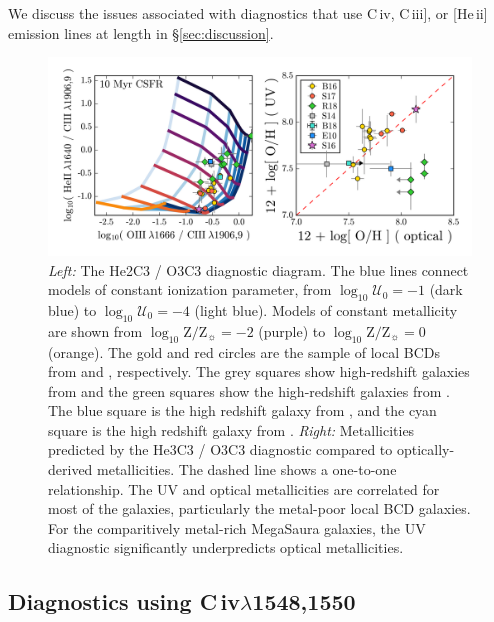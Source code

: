 \documentclass[preprint2]{aastex62}
\newcommand{\heii}{[He\,{\sc ii}]\xspace}
\newcommand{\civ}{C\,{\sc iv}\xspace}
\newcommand{\ciii}{C\,{\sc iii}]\xspace}
\newcommand{\logten}{\ensuremath{\log_{10}}}
\newcommand{\logZeq}[1]{\ensuremath{\logten \mathrm{Z}/\mathrm{Z}_{\sun} = #1}}
\newcommand{\logUeq}[1]{\ensuremath{\logten \mathcal{U}_0 = #1}}
\newcommand{\mage}{{\sc Meg}a{\sc S}a{\sc ura}\xspace}
\begin{document}
We discuss the issues associated with diagnostics that use \civ, \ciii, or \heii emission lines at length in \S\ref{sec:discussion}.

\begin{figure}
  \begin{center}
    \includegraphics[width=\linewidth]{figs/f4.png}
    \caption{\emph{Left:} The He2C3 / O3C3 diagnostic diagram.  The blue lines connect models of constant ionization parameter, from \logUeq{-1} (dark blue) to \logUeq{-4} (light blue). Models of constant metallicity are shown from \logZeq{-2} (purple) to \logZeq{0} (orange). The gold and red circles are the sample of local BCDs from \citet{Berg+2016} and \citet{Senchyna+2017}, respectively. The grey squares show high-redshift galaxies from \citet{Stark+2014} and the green squares show the high-redshift galaxies from \citet{Rigby+2018b}. The blue square is the high redshift galaxy from \citet{Erb+2010}, and the cyan square is the high redshift galaxy from \citet{Berg+2018}. \emph{Right:} Metallicities predicted by the He3C3 / O3C3 diagnostic compared to optically-derived metallicities. The dashed line shows a one-to-one relationship. The UV and optical metallicities are correlated for most of the galaxies, particularly the metal-poor local BCD galaxies. For the comparitively metal-rich \mage galaxies, the UV diagnostic significantly underpredicts optical metallicities.}
    \label{fig:UVHe}
  \end{center}
\end{figure}

\subsection{Diagnostics using \civ$\lambda$1548,1550}\label{sec:UVOpt:CIV}
\end{document}
